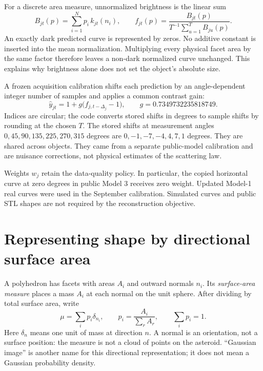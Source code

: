 \documentclass[11pt,a4paper]{article}
\begin{document}
For a discrete area measure, unnormalized brightness is the linear sum
\begin{equation}
 B_{jt}(p)=\sum_{i=1}^{N}p_i\,k_{jt}(n_i),
 \qquad f_{jt}(p)=\frac{B_{jt}(p)}{T^{-1}\sum_{u=1}^{T}B_{ju}(p)}.
 \label{eq:brightness}
\end{equation}
An exactly dark predicted curve is represented by zeros. No additive constant is inserted into the mean normalization. Multiplying every physical facet area by the same factor therefore leaves a non-dark normalized curve unchanged. This explains why brightness alone does not set the object's absolute size.

A frozen acquisition calibration shifts each prediction by an angle-dependent integer number of samples and applies a common contrast gain:
\begin{equation}
 \widehat y_{jt}=1+g\bigl(f_{j,t-\Delta_j}-1\bigr),
 \qquad g=0.7349732235818749.
 \label{eq:calibration}
\end{equation}
Indices are circular; the code converts stored shifts in degrees to sample shifts by rounding at the chosen $T$. The stored shifts at measurement angles $0,45,90,135,225,270,315$ degrees are $0,-1,-7,-4,4,7,1$ degrees. They are shared across objects. They came from a separate public-model calibration and are nuisance corrections, not physical estimates of the scattering law.

Weights $w_j$ retain the data-quality policy. In particular, the copied horizontal curve at zero degrees in public Model 3 receives zero weight. Updated Model-1 real curves were used in the September calibration. Simulated curves and public STL shapes are not required by the reconstruction objective.

\clearpage
\section{Representing shape by directional surface area}
A polyhedron has facets with areas $A_i$ and outward normals $n_i$. Its \emph{surface-area measure} places a mass $A_i$ at each normal on the unit sphere. After dividing by total surface area, write
\begin{equation}
 \mu=\sum_i p_i\delta_{n_i},\qquad
 p_i=\frac{A_i}{\sum_r A_r},\qquad \sum_i p_i=1.
 \label{eq:measure}
\end{equation}
Here $\delta_n$ means one unit of mass at direction $n$. A normal is an orientation, not a surface position: the measure is not a cloud of points on the asteroid. ``Gaussian image'' is another name for this directional representation; it does not mean a Gaussian probability density.
\end{document}
